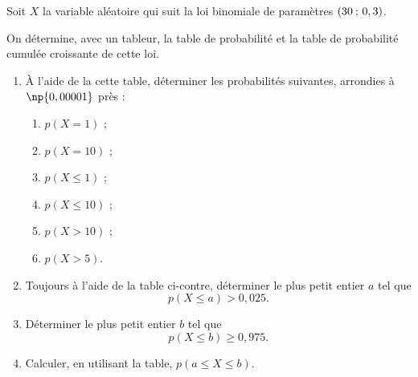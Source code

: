 \documentclass[12pt,openright,twoside,french]{book}
\begin{document}

\begin{minipage}{0.6\linewidth}
Soit $X$ la variable aléatoire qui suit la loi binomiale de paramètres $(30 \: ; \, 0,3)$.\par
On détermine, avec un tableur, la table de probabilité et la table de probabilité cumulée croissante de cette loi.

\begin{enumerate}
    \item À l'aide de la cette table, déterminer les probabilités suivantes, arrondies à $\np{0,00001}$ près :
        \begin{enumerate}
            \item $p(X = 1)$ ;
            \item $p(X = 10)$ ;
            \item $p(X \leq 1)$ ;
            \item $p(X \leq 10)$ ;
            \item $p(X > 10)$ ;
            \item $p(X > 5)$.
        \end{enumerate}
    \item Toujours à l'aide de la table ci-contre, déterminer le plus petit entier $a$ tel que \[p(X \leq a) > 0,025.\]
    \item Déterminer le plus petit entier $b$ tel que \[p(X \leq b) \geq 0,975.\]
    \item Calculer, en utilisant la table, $p(a \leq X \leq b)$.
\end{enumerate}
\end{minipage}\hfill
\end{document}

